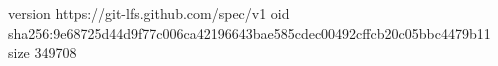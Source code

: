 version https://git-lfs.github.com/spec/v1
oid sha256:9e68725d44d9f77c006ca42196643bae585cdec00492cffcb20c05bbc4479b11
size 349708
